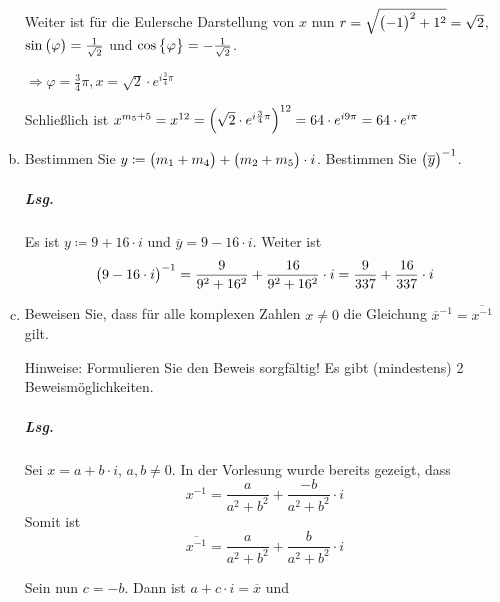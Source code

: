 \documentclass{scrreprt}
\begin{document}
\begin{enumerate}[(a)]
  Weiter ist für die Eulersche Darstellung von $x$ nun
  $r = \sqrt{\qty\big(-1)^2 + 1^2} = \sqrt{2}$,
  $\sin\qty\big(\varphi) = \frac{1}{\sqrt{2}}$ und
  $\cos\qty\big{\varphi} = -\frac{1}{\sqrt{2}}$.

  $\Rightarrow \varphi = \frac{3}{4}\pi, x = \sqrt{2} \cdot e^{i\frac{3}{4}\pi}$

  Schließlich ist $x^{m_5 + 5} = x^{12} = \qty(\sqrt{2} \cdot e^{i\frac{3}{4}\pi})^{12} = 64 \cdot e^{i9\pi} = 64 \cdot e^{i\pi}$

\item Bestimmen Sie $y \coloneqq \qty\big(m_1 + m_4) + \qty\big(m_2 + m_5) \cdot i$.
  Bestimmen Sie $\qty\big(\overline{y})^{-1}$.

  \subparagraph{Lsg.} Es ist $y \coloneqq 9 + 16 \cdot i$ und
  $\overline{y} = 9 - 16 \cdot i$.
  Weiter ist
  \[
    \qty\big(9 - 16 \cdot i)^{-1}
    = \frac{9}{9^2 + 16^2} + \frac{16}{9^2 + 16^2} \cdot i
    = \frac{9}{337} + \frac{16}{337} \cdot i
  \]

\newpage
\item Beweisen Sie, dass für alle komplexen Zahlen $x \ne 0$ die Gleichung
  $\overline{x}^{-1} = \overline{x^{-1}}$ gilt.

  Hinweise: Formulieren Sie den Beweis sorgfältig!
  Es gibt (mindestens) 2 Beweismöglichkeiten.

  \subparagraph{Lsg.} Sei $x = a + b \cdot i$, $a, b \ne 0$.
  In der Vorlesung wurde bereits gezeigt, dass
  \[
    x^{-1} = \frac{a}{a^2 + b^2} + \frac{-b}{a^2 + b^2} \cdot i
  \]
  Somit ist
  \[
    \overline{x^{-1}} = \frac{a}{a^2 + b^2} + \frac{b}{a^2 + b^2} \cdot i
  \]

  Sein nun $c = -b$.
  Dann ist $a + c \cdot i = \overline{x}$ und
\end{enumerate}
\end{document}
